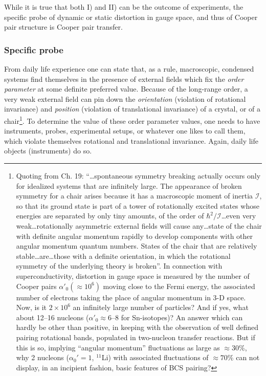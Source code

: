 While it is true that both I) and II) can be the outcome of experiments, the specific probe of dynamic or static distortion in gauge space, and thus of Cooper pair structure is Cooper pair transfer.



\subsubsection{Specific probe}
From daily life experience one can state that, as a rule, macroscopic, condensed systems find themselves in the presence of external fields which fix the \textit{order parameter} at some definite preferred value. Because of the long-range order, a very weak external field can pin down the \textit{orientation} (violation of rotational invariance) and \textit{position} (violation of translational invariance) of a crystal, or of a chair\footnote{Quoting from \cite{Weinberg:96b} Ch. 19: ``\dots spontaneous symmetry breaking actually occurs only for idealized systems that are infinitely large. The appearance of broken symmetry for a chair arises because it has a macroscopic moment of inertia $\mathcal I$, so that its ground state is part of a tower of rotationally excited states whose energies are separated by only tiny amounts, of the order of $\hbar^2/\mathcal I$\dots even very weak\dots rotationally asymmetric external fields will cause any\dots state of the chair with definite angular momentum rapidly to develop components with other angular momentum quantum numbers. States of the chair that are relatively stable\dots are\dots those with a definite orientation, in which the rotational symmetry of the underlying theory is broken''. In connection with superconductivity, distortion in gauge space is measured by the number of Cooper pairs   $\alpha'_0(\approx10^6)$ 
	 moving close to the Fermi energy, the associated number of electrons taking the place of angular momentum in 3-D space. Now, is it $2\times10^6$ an infinitely large number of particles? And if yes, what about 12--16 nucleons ($\alpha'_0\approx6$--8 for Sn-isotopes)? An answer which can hardly be other than positive, in keeping with the observation of well defined pairing rotational bands, populated in two-nucleon transfer reactions. But if this is so, implying ``angular momentum'' fluctuations as large as $\approx30$\%, why 2 nucleons ($\alpha_0'=1$, $^{11}$Li) with associated fluctuations of $\approx70$\% can not display, in an incipient fashion, basic features of BCS pairing?}.  To determine the value of these order parameter values, one needs to have instruments, probes, experimental setups, or whatever one likes to call them, which violate themselves rotational and translational invariance. Again, daily life objects (instruments) do so.


